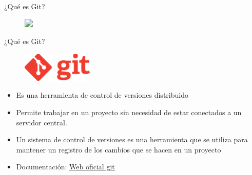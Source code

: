 \documentclass{beamer}
\begin{document}
\begin{frame}{¿Qué es Git?}

  \begin{figure}
    \includegraphics<1->[width=0.8\textwidth]{images/cap-one.png}
  \end{figure}


\end{frame}


\begin{frame}{¿Qué es Git?}
  \begin{figure}
    \includegraphics[width = 0.3\textwidth]{images/logo_git.png}
  \end{figure}

  \begin{itemize}
    \item Es una herramienta de control de versiones distribuido
    \item Permite trabajar en un proyecto sin necesidad de estar
    conectados a un servidor central.
    \item Un sistema de control de versiones es una herramienta que se utiliza para mantener un registro de los cambios que se hacen en un proyecto
    \item Documentación: \href{https://git-scm.com}{Web oficial git} 
  \end{itemize}

\end{frame}


  
\end{document}
